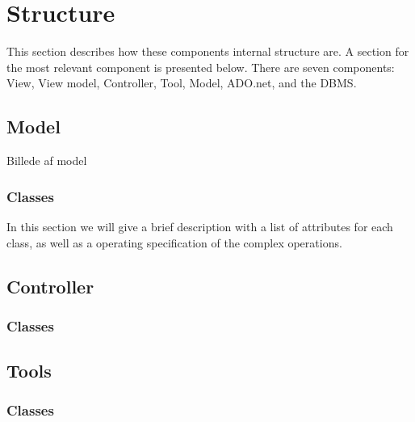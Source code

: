 \section{Structure}

This section describes how these components internal structure are.
A section for the most relevant component is presented below.
There are seven components: View, View model, Controller, Tool, Model, ADO.net, and the DBMS. 



\subsection{Model}

Billede af model


\subsubsection{Classes}
In this section we will give a brief description with a list of attributes for each class, as well as a operating specification of the complex operations.



\subsection{Controller}

 
\subsubsection{Classes}

\subsection{Tools}

\subsubsection{Classes}